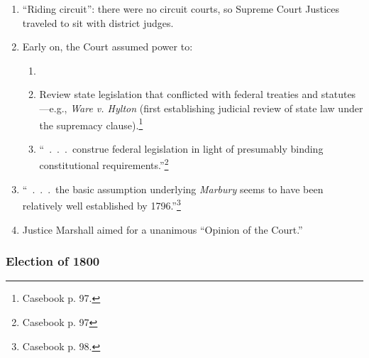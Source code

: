 \begin{enumerate}
    \item ``Riding circuit'': there were no circuit courts, so Supreme Court 
    Justices traveled to sit with district judges.
    \item Early on, the Court assumed power to:
    \begin{enumerate}
        \item 
        \item Review state legislation that conflicted with 
        federal treaties and statutes---e.g., \emph{Ware v. Hylton} (first 
        establishing judicial review of state law under the supremacy 
        clause).\footnote{Casebook p. 97.}
        \item ``~.~.~.~construe federal legislation in light of 
        presumably binding constitutional requirements.''\footnote{Casebook p. 
        97}
    \end{enumerate}
    \item ``~.~.~.~the basic assumption underlying \emph{Marbury} seems to 
    have been relatively well established by 1796.''\footnote{Casebook p. 98.}
    \item Justice Marshall aimed for a unanimous ``Opinion of the Court.''
\end{enumerate}

\subsubsection{Election of 1800}

